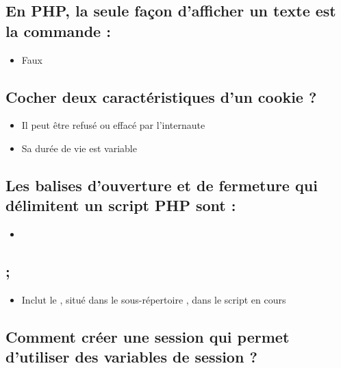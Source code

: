\documentclass[11pt,a4paper]{article}
\begin{document}
\subsection{En PHP, la seule façon d'afficher un texte est la commande  :}

\begin{itemize}
\item[\CaseCoche] Faux \\
\end{itemize}


\subsection{Cocher deux caractéristiques d'un cookie ?}

\begin{itemize}
\item[\CaseCoche] Il peut être refusé ou effacé par l'internaute \\
\item[\CaseCoche] Sa durée de vie est variable \\
\end{itemize}


\subsection{Les balises d'ouverture et de fermeture qui délimitent un script PHP sont :}

\begin{itemize}
\item[\CaseCoche]  \\
\end{itemize}


\subsection{;}

\begin{itemize}
\item[\CaseCoche] Inclut le , situé dans le sous-répertoire , dans le script en cours \\
\end{itemize}


\subsection{Comment créer une session qui permet d'utiliser des variables de session ?}
\end{document}
